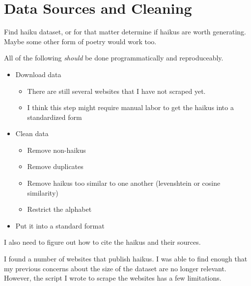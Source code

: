 \section{Data Sources and Cleaning}\label{sec:data}

{\color{red}
    Find haiku dataset, or for that matter determine if haikus are worth
    generating. Maybe some other form of poetry would work too.

    All of the following \textit{should} be done programmatically and reproduceably.
    \begin{itemize}
        \item Download data
              \begin{itemize}
                  \item There are still several websites that I have not scraped yet.
                  \item I think this step might require manual labor to get the haikus into a
                        standardized form
              \end{itemize}
        \item Clean data
              \begin{itemize}
                  \item Remove non-haikus
                  \item Remove duplicates
                  \item Remove haikus too similar to one another (levenshtein or
                        cosine similarity)
                  \item Restrict the alphabet
              \end{itemize}
        \item Put it into a standard format
    \end{itemize}

    I also need to figure out how to cite the haikus and their sources.
}

I found a number of websites that publish haikus. I was able to find enough that my previous
concerns about the size of the dataset are no longer relevant. However, the script I wrote to
scrape the websites has a few limitations.

